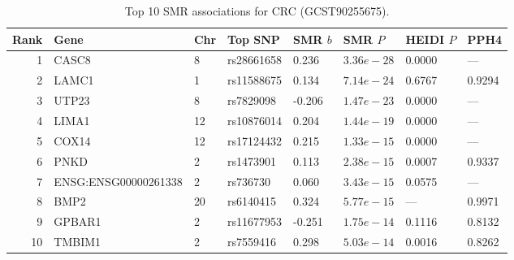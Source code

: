 \begin{table}[htbp]
\centering
\caption{Top 10 SMR associations for CRC (GCST90255675).}\label{tab:smr_top10}
\small
\begin{tabular}{rlllllll}
\toprule
  Rank & Gene & Chr & Top SNP & SMR $b$ & SMR $P$ & HEIDI $P$ & PPH4 \\
\midrule
  1 & CASC8 & 8 & rs28661658 & 0.236 & $3.36e-28$ & 0.0000 & --- \\
  2 & LAMC1 & 1 & rs11588675 & 0.134 & $7.14e-24$ & 0.6767 & 0.9294 \\
  3 & UTP23 & 8 & rs7829098 & -0.206 & $1.47e-23$ & 0.0000 & --- \\
  4 & LIMA1 & 12 & rs10876014 & 0.204 & $1.44e-19$ & 0.0000 & --- \\
  5 & COX14 & 12 & rs17124432 & 0.215 & $1.33e-15$ & 0.0000 & --- \\
  6 & PNKD & 2 & rs1473901 & 0.113 & $2.38e-15$ & 0.0007 & 0.9337 \\
  7 & ENSG:ENSG00000261338 & 2 & rs736730 & 0.060 & $3.43e-15$ & 0.0575 & --- \\
  8 & BMP2 & 20 & rs6140415 & 0.324 & $5.77e-15$ & --- & 0.9971 \\
  9 & GPBAR1 & 2 & rs11677953 & -0.251 & $1.75e-14$ & 0.1116 & 0.8132 \\
  10 & TMBIM1 & 2 & rs7559416 & 0.298 & $5.03e-14$ & 0.0016 & 0.8262 \\
\bottomrule
\end{tabular}

\end{table}
